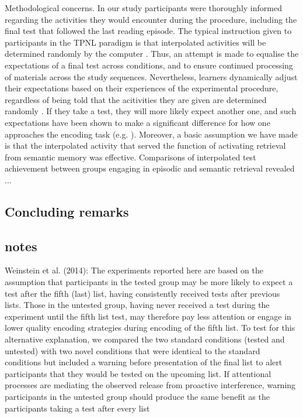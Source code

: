 \documentclass[../main.tex]{subfiles}
\begin{document}
Methodological concerns. In our study participants were thoroughly informed
regarding the activities they would encounter during the procedure, including
the final test that followed the last reading episode. The typical instruction
given to participants in the TPNL paradigm is that interpolated activities 
will be determined randomly by the computer \cite{Yang}. Thus, an attempt is 
made to equalise the expectations of a final test across conditions, and to 
ensure continued processing of materials across the study sequences. Nevertheless,
learners dynamically adjust their expectations based on their experiences of 
the experimental procedure, regardless of being told that the acitivities they
are given are determined randomly \citep{weinsteinRoleTestExpectancy2014}. If
they take a test, they will more likely expect another one, and such expectations
have been shown to make a significant difference for how one approaches
the encoding task (e.g. \citealp{szpunarExpectationFinalCumulative2007}).
Moreover, a basic assumption we have made is that the interpolated activity that
served the function of activating retrieval from semantic memory was effective.
Comparisons of interpolated test achievement between groups engaging in episodic
and semantic retrieval revealed ...



\subsection{Concluding remarks}









\subsection{notes}

Weinstein et al. (2014):
The experiments reported here are based on the assumption that
participants in the tested group may be more likely to expect a test
after the fifth (last) list, having consistently received tests after
previous lists. Those in the untested group, having never received
a test during the experiment until the fifth list test, may therefore
pay less attention or engage in lower quality encoding strategies
during encoding of the fifth list. To test for this alternative explanation, 
we compared the two standard conditions (tested and
untested) with two novel conditions that were identical to the
standard conditions but included a warning before presentation of
the final list to alert participants that they would be tested on the
upcoming list. If attentional processes are mediating the observed
release from proactive interference, warning participants in the
untested group should produce the same benefit as the participants
taking a test after every list
\end{document}
